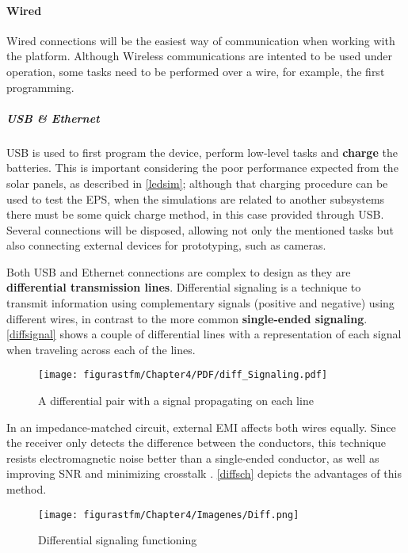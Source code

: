 \paragraph{Wired}

Wired connections will be the easiest way of communication when working with the platform. Although Wireless communications are intented to be used under operation, some tasks need to be performed over a wire, for example, the first programming.

\subparagraph{USB \& Ethernet}

\acrshort{USB} is used to first program the device, perform low-level tasks and \textbf{charge} the batteries. This is important considering the poor performance expected from the solar panels, as described in \autoref{ledsim}; although that charging procedure can be used to test the \acrshort{EPS}, when the simulations are related to another subsystems there must be some quick charge method, in this case provided through \acrshort	{USB}.  Several connections will be disposed, allowing not only the mentioned tasks but also connecting external devices for prototyping, such as cameras. 

Both \acrshort{USB} and Ethernet connections are complex to design as they are \textbf{differential transmission lines}. Differential signaling is a technique to transmit information using complementary signals (positive and negative) using different wires, in contrast to the more common \textbf{single-ended signaling}. \autoref{diffsignal} shows a couple of differential lines with a representation of each signal when traveling across each of the lines.

\begin{figure} [H]
			\centering
			\texttt{[image: figurastfm/Chapter4/PDF/diff\_Signaling.pdf]}
			\caption{A differential pair with a signal propagating on each line \cite{bogatin}} \label{diffsignal}
\end{figure}


In an impedance-matched circuit, external \acrshort{EMI} affects both wires equally. Since the receiver only detects the difference between the conductors, this technique resists electromagnetic noise better than a single-ended conductor, as well as improving \acrshort{SNR} and minimizing crosstalk \cite{wiki}. \autoref{diffsch} depicts the advantages of this method.


\begin{figure} [H]
			\centering
			\texttt{[image: figurastfm/Chapter4/Imagenes/Diff.png]}
			\caption{Differential signaling functioning \cite{wiki}} \label{diffsch}
\end{figure}

